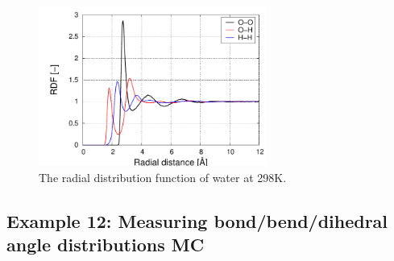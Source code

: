 \begin{figure}[H]
  \centering
  \includegraphics[width=7.5cm]{./Examples/RDFWater.pdf}
  \caption{The radial distribution function of water at 298K.}
  \label{Fig: RDF water}
\end{figure}


\subsection*{Example 12: Measuring bond/bend/dihedral angle distributions MC}

